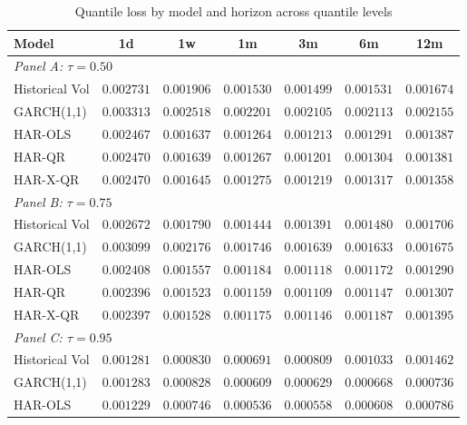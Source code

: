 \begin{table}[htbp]
\centering
\small
\caption{Quantile loss by model and horizon across quantile levels}
\label{tab:quantile-loss-all}
\begin{tabular}{lcccccc}
\toprule
Model & 1d & 1w & 1m & 3m & 6m & 12m \\
\midrule
\multicolumn{7}{l}{\textit{Panel A: $\tau = 0.50$}} \\
\addlinespace
Historical Vol   & $0.002731$ & $0.001906$ & $0.001530$ & $0.001499$ & $0.001531$ & $0.001674$ \\
GARCH(1,1)       & $0.003313$ & $0.002518$ & $0.002201$ & $0.002105$ & $0.002113$ & $0.002155$ \\
HAR-OLS          & $\mathbf{0.002467}$ & $\mathbf{0.001637}$ & $\mathbf{0.001264}$ & $0.001213$ & $\mathbf{0.001291}$ & $0.001387$ \\
HAR-QR           & $0.002470$ & $0.001639$ & $0.001267$ & $\mathbf{0.001201}$ & $0.001304$ & $0.001381$ \\
HAR-X-QR         & $0.002470$ & $0.001645$ & $0.001275$ & $0.001219$ & $0.001317$ & $\mathbf{0.001358}$ \\
\midrule
\multicolumn{7}{l}{\textit{Panel B: $\tau = 0.75$}} \\
\addlinespace
Historical Vol   & $0.002672$ & $0.001790$ & $0.001444$ & $0.001391$ & $0.001480$ & $0.001706$ \\
GARCH(1,1)       & $0.003099$ & $0.002176$ & $0.001746$ & $0.001639$ & $0.001633$ & $0.001675$ \\
HAR-OLS          & $0.002408$ & $0.001557$ & $0.001184$ & $0.001118$ & $0.001172$ & $\mathbf{0.001290}$ \\
HAR-QR           & $\mathbf{0.002396}$ & $\mathbf{0.001523}$ & $\mathbf{0.001159}$ & $\mathbf{0.001109}$ & $\mathbf{0.001147}$ & $0.001307$ \\
HAR-X-QR         & $0.002397$ & $0.001528$ & $0.001175$ & $0.001146$ & $0.001187$ & $0.001395$ \\
\midrule
\multicolumn{7}{l}{\textit{Panel C: $\tau = 0.95$}} \\
\addlinespace
Historical Vol   & $0.001281$ & $0.000830$ & $0.000691$ & $0.000809$ & $0.001033$ & $0.001462$ \\
GARCH(1,1)       & $0.001283$ & $0.000828$ & $0.000609$ & $0.000629$ & $0.000668$ & $\mathbf{0.000736}$ \\
HAR-OLS          & $0.001229$ & $0.000746$ & $0.000536$ & $0.000558$ & $\mathbf{0.000608}$ & $0.000786$ \\

\end{tabular}
\end{table}
